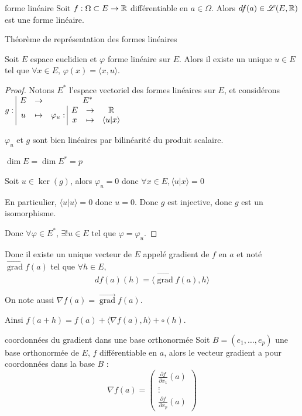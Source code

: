\begin{definition}{forme linéaire}{}
    Soit $f : \Omega \subset E \to \mathbb{R}$ différentiable en $a \in \Omega$. 
    Alors $df(a) \in \mathscr L(E, \mathbb{R})$ est une forme linéaire. 
\end{definition}

 Théorème de représentation des formes linéaires

\avspace Soit $E$ espace euclidien et $\varphi$ forme linéaire sur $E$. 
Alors il existe un unique $u \in E$ tel que $\forall x \in E, \, \varphi(x) = \langle x, u \rangle$.


\begin{proof}
    Notons $E^*$ l'espace vectoriel des formes linéaires sur $E$, et considérons 
    $g: \space \begin{array}{|ccc} \displaystyle E & \to & \displaystyle E^* \\ \displaystyle u & \mapsto & \displaystyle \varphi_u: \space \begin{array}{|ccc} \displaystyle E & \to & \displaystyle \mathbb{R} \\ \displaystyle x & \mapsto & \displaystyle \langle u | x \rangle \end{array} \end{array}$

    $\varphi_u$ et $g$ sont bien linéaires par bilinéarité du produit scalaire.

    $\dim E= \dim E^* = p$

    Soit $u \in \ker(g)$, alors $\varphi_u = 0$ donc $\forall x \in E, \langle u | x \rangle = 0$

    En particulier, $\langle u | u \rangle = 0$ donc $u = 0$. Donc $g$ est injective, donc $g$ est un isomorphisme.

    Donc $\forall \varphi \in E^*$, $\exists ! u \in E$ tel que $\varphi = \varphi_u$. 
\end{proof}



Donc il existe un unique vecteur de $E$ appelé gradient de $f$ en $a$ et noté 
$\overrightarrow{\operatorname{grad}} f(a)$ tel que $\forall h \in E$, 
$$df(a)(h) = \langle \overrightarrow{\operatorname{grad}} f(a) , h \rangle$$
 
On note aussi $\nabla f(a) = \overrightarrow{\operatorname{grad}} f(a)$.

Ainsi $f(a + h) = f(a) + \langle \nabla f(a), h \rangle + \circ(h)$.

\begin{proposition}{coordonnées du gradient dans une base orthonormée}{}
    Soit $B = (e_1, \ldots, e_p)$ une base orthonormée de $E$, $f$ différentiable en $a$, alors 
    le vecteur gradient a pour coordonnées dans la base $B$ :
    $$\nabla f(a) = \begin{pmatrix}
        \frac{\partial f}{\partial x_1} (a) \\
        \vdots \\
        \frac{\partial f}{\partial x_p} (a)
    \end{pmatrix}$$
\end{proposition}

